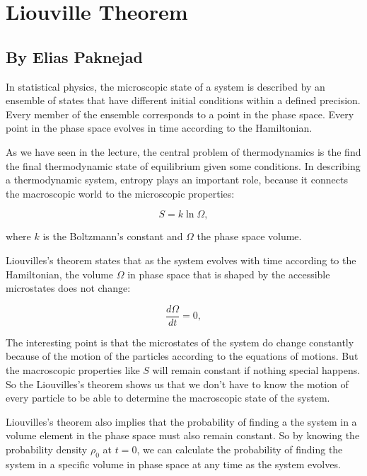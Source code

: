 \section{Liouville Theorem}

\subsection*{By Elias Paknejad}

In statistical physics, the microscopic state of a system is described by an ensemble of states that have different initial conditions within a defined precision. Every member of the ensemble corresponds to a point in the phase space. Every point in the phase space evolves in time according to the Hamiltonian.

As we have seen in the lecture, the central problem of thermodynamics is the find the final thermodynamic state of equilibrium given some conditions. In describing a thermodynamic system, entropy plays an important role, because it connects the  macroscopic world to the microscopic properties:

\begin{equation}
S = k \ln{\Omega},
\end{equation}

where $k$ is the Boltzmann's constant and $\Omega$ the phase space volume.

Liouvilles's theorem states that as the system evolves with time according to the Hamiltonian, the volume $\Omega$ in phase space that is shaped by the accessible microstates does not change:

\begin{equation}
\frac{d\Omega}{dt} = 0,
\end{equation}


The interesting point is that the microstates of the system do change constantly because of the motion of the particles according to the equations of motions. But the macroscopic properties like $S$ will remain constant if nothing special happens. So the Liouvilles's theorem shows us that we don't have to know the motion of every particle to be able to determine the macroscopic state of the system. 

Liouvilles's theorem  also implies that the probability of finding a the system in a volume element in the phase space must also remain constant. So by knowing the probability density $\rho_0$ at $t=0$, we can calculate the probability of finding the system in a specific volume in phase space at any time as the system evolves.
